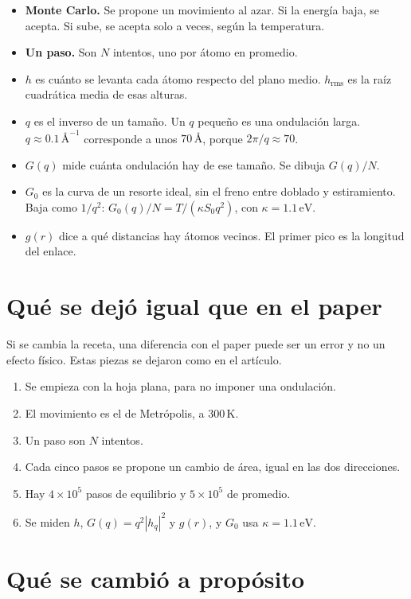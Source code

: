 \documentclass[11pt,a4paper]{article}
\begin{document}
\begin{itemize}
\item \textbf{Monte Carlo.} Se propone un movimiento al azar.
Si la energía baja, se acepta.
Si sube, se acepta solo a veces, según la temperatura.
\item \textbf{Un paso.} Son $N$ intentos, uno por átomo en promedio.
\item $h$ es cuánto se levanta cada átomo respecto del plano medio.
$h_{\mathrm{rms}}$ es la raíz cuadrática media de esas alturas.
\item $q$ es el inverso de un tamaño.
Un $q$ pequeño es una ondulación larga.
$q\approx 0.1\,\text{\AA}^{-1}$ corresponde a unos $70\,\text{\AA}$, porque $2\pi/q\approx 70$.
\item $G(q)$ mide cuánta ondulación hay de ese tamaño.
Se dibuja $G(q)/N$.
\item $G_0$ es la curva de un resorte ideal, sin el freno entre doblado y estiramiento.
Baja como $1/q^2$: $G_0(q)/N=T/(\kappa S_0 q^2)$, con $\kappa=1.1\,\mathrm{eV}$.
\item $g(r)$ dice a qué distancias hay átomos vecinos.
El primer pico es la longitud del enlace.
\end{itemize}

\section{Qué se dejó igual que en el paper}

Si se cambia la receta, una diferencia con el paper puede ser un error y no un efecto físico.
Estas piezas se dejaron como en el artículo.

\begin{enumerate}
\item Se empieza con la hoja plana, para no imponer una ondulación.
\item El movimiento es el de Metrópolis, a $300\,\mathrm{K}$.
\item Un paso son $N$ intentos.
\item Cada cinco pasos se propone un cambio de área, igual en las dos direcciones.
\item Hay $4\times 10^5$ pasos de equilibrio y $5\times 10^5$ de promedio.
\item Se miden $h$, $G(q)=q^2|h_q|^2$ y $g(r)$, y $G_0$ usa $\kappa=1.1\,\mathrm{eV}$.
\end{enumerate}

\section{Qué se cambió a propósito}
\end{document}
